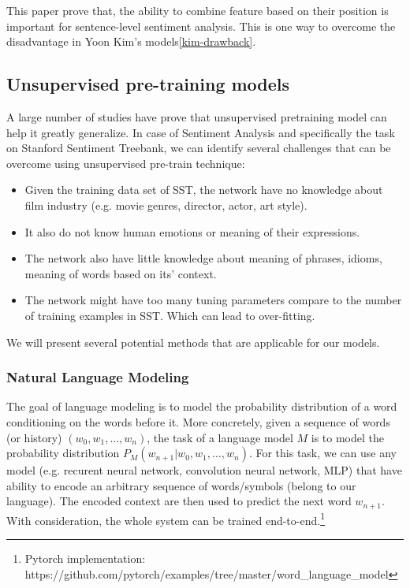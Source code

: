 This paper prove that, the ability to combine feature based on their position is important for sentence-level sentiment analysis. 
This is one way to overcome the disadvantage in Yoon Kim's models\ref{kim-drawback}.


\subsection{Unsupervised pre-training models}
A large number of studies have prove that unsupervised pretraining model can help it greatly generalize\cite{why-unsupervised}\cite{greedy-layer}\cite{greedy-layer-bengio}\cite{pretrain-1}.
In case of Sentiment Analysis and specifically the task on Stanford Sentiment Treebank, we can identify several challenges that can be overcome using unsupervised pre-train technique\cite{why-unsupervised}:
\begin{itemize}
\item Given the training data set of SST, the network have no knowledge about film industry (e.g. movie genres, director, actor, art style). 
\item It also do not know human emotions or meaning of their expressions.
\item The network also have little knowledge about meaning of phrases, idioms, meaning of words based on its' context.
\item The network might have too many tuning parameters compare to the number of training examples in SST. 
Which can lead to over-fitting.
\end{itemize}
We will present several potential methods that are applicable for our models. 

\subsubsection{Natural Language Modeling}
The goal of language modeling is to model the probability distribution of a word conditioning on the words before it.
More concretely, given a sequence of words (or history) \((w_0, w_1,\ldots,w_n)\), the task of a language model \(M\) is to model the probability distribution \(P_M(w_{n+1}|w_0, w_1,\ldots,w_n)\). 
For this task, we can use any model (e.g. recurent neural network, convolution neural network, MLP) that have ability to encode an arbitrary sequence of words/symbols (belong to our language).
The encoded context are then used to predict the next word \(w_{n+1}\).
With consideration, the whole system can be trained end-to-end.\footnote{Pytorch implementation: https://github.com/pytorch/examples/tree/master/word\_language\_model}

